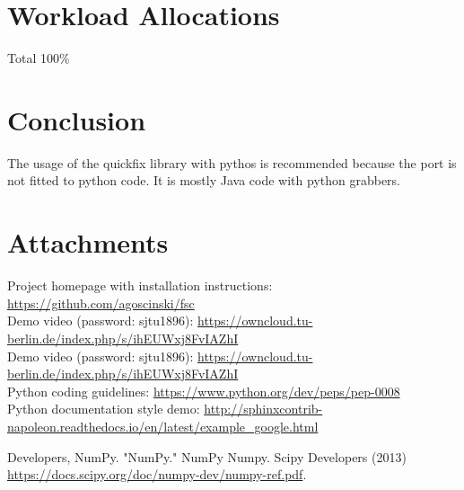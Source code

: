 \documentclass[a4paper, 11pt]{article}
\begin{document}

\section*{Workload Allocations}
Total 100\% \\

\section*{Conclusion}
The usage of the quickfix library with pythos is recommended because the port is not fitted to python code. It is mostly Java code with python grabbers.

\section*{Attachments}
Project homepage with installation instructions: \url{https://github.com/agoscinski/fsc} \\
Demo video (password: sjtu1896): \url{https://owncloud.tu-berlin.de/index.php/s/ihEUWxj8FvIAZhI} \\
Demo video (password: sjtu1896): \url{https://owncloud.tu-berlin.de/index.php/s/ihEUWxj8FvIAZhI} \\
Python coding guidelines: \url{https://www.python.org/dev/peps/pep-0008} \\
Python documentation style demo: \url{http://sphinxcontrib-napoleon.readthedocs.io/en/latest/example_google.html}

\begin{thebibliography}{9}
 Developers, NumPy. "NumPy." NumPy Numpy. Scipy Developers (2013) \url{https://docs.scipy.org/doc/numpy-dev/numpy-ref.pdf}.
\end{thebibliography}
\end{document}
